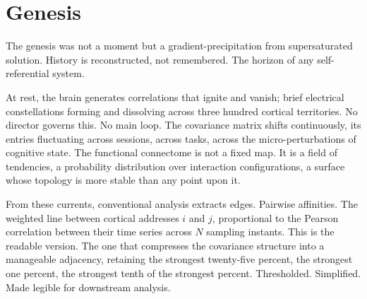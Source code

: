 



\section{Genesis}

The genesis was not a moment but a gradient-precipitation from supersaturated solution. History is reconstructed, not remembered. The horizon of any self-referential system.

At rest, the brain generates correlations that ignite and vanish; brief electrical constellations forming and dissolving across three hundred cortical territories. No director governs this. No main loop. The covariance matrix shifts continuously, its entries fluctuating across sessions, across tasks, across the micro-perturbations of cognitive state. The functional connectome is not a fixed map. It is a field of tendencies, a probability distribution over interaction configurations, a surface whose topology is more stable than any point upon it.

From these currents, conventional analysis extracts edges. Pairwise affinities. The weighted line between cortical addresses $i$ and $j$, proportional to the Pearson correlation between their time series across $N$ sampling instants. This is the readable version. The one that compresses the covariance structure into a manageable adjacency, retaining the strongest twenty-five percent, the strongest one percent, the strongest tenth of the strongest percent. Thresholded. Simplified. Made legible for downstream analysis.

